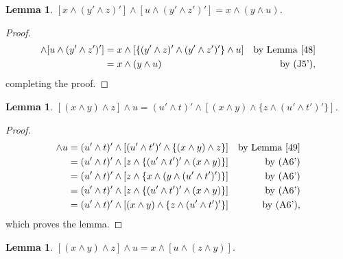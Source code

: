 \documentclass{amsart}
\theoremstyle{plain}
\newtheorem{lemma}[theorem]{Lemma}
\theoremstyle{problem}
\theoremstyle{definition}
\theoremstyle{remark}
\numberwithin{equation}{section}
\begin{document}
\begin{lemma}\label{410}
    $[x \land (y' \land z)'] \land [u \land (y' \land z')'] = x \land (y \land u)$.
\end{lemma}

\begin{proof}
\begin{align*}
    [x \land (y' \land z)'] \land [u \land (y' \land z')']
         &= x \land [ \{(y' \land z)' \land (y' \land z')'\} \land u] &\text{by Lemma \ref{48}}\\         
         &= x \land (y \land u) &\text{by (J5')},
\end{align*}
completing the proof.
\end{proof}

\begin{lemma}\label{411}
    $[(x \land y) \land z] \land u = (u' \land t)' \land [(x \land y) \land \{z \land (u' \land t')'\}]$.
\end{lemma}

\begin{proof}
\begin{align*}
    [(x \land y) \land z] \land u
           &= (u' \land t)' \land [(u' \land t')' \land \{(x \land y) \land z \}]
                          &\text{by Lemma \ref{49}}\\   
          &= (u' \land t)' \land [z \land \{(u' \land t')' \land (x \land y)\}]
           &\text{by (A6')}\\
           &= (u' \land t)' \land [z \land \{x \land (y \land (u' \land t')')\}]
           &\text{by (A6')}\\
           &= (u' \land t)' \land [z \land\{(u' \land t')' \land (x \land y )\}]
           &\text{by (A6')}\\
           &= (u' \land t)' \land [(x \land y) \land \{z \land (u' \land t')'\}]
           &\text{by (A6')},
\end{align*}
which proves the lemma.
\end{proof}

\begin{lemma}\label{412}
  $[(x \land y) \land z] \land u = x \land [u \land (z \land y)]$.  
\end{lemma}
\end{document}
